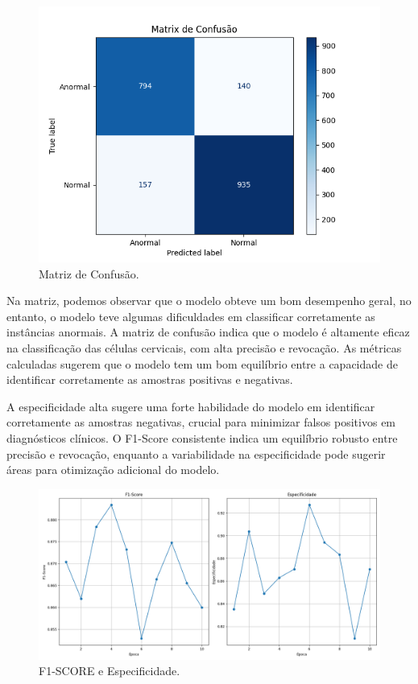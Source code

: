 \begin{figure}[H]
    \centering
    \includegraphics[width=1.0\textwidth]{figuras/matriz.png}
    \caption{Matriz de Confusão.}
    \label{fig:nome_da_imagem}
\end{figure}


Na matriz, podemos observar que o modelo obteve um bom desempenho geral, no entanto, o modelo teve algumas dificuldades em classificar corretamente as instâncias anormais. A matriz de confusão indica que o modelo é altamente eficaz na classificação das células cervicais, com alta precisão e revocação. As métricas calculadas sugerem que o modelo tem um bom equilíbrio entre a capacidade de identificar corretamente as amostras positivas e negativas.

A especificidade alta sugere uma forte habilidade do modelo em identificar corretamente as amostras negativas, crucial para minimizar falsos positivos em diagnósticos clínicos. O F1-Score consistente indica um equilíbrio robusto entre precisão e revocação, enquanto a variabilidade na especificidade pode sugerir áreas para otimização adicional do modelo.

\begin{figure}[H]
    \centering
    \includegraphics[width=1.0\textwidth]{figuras/F1_Esp.png}
    \caption{F1-SCORE e Especificidade.}
    \label{fig:nome_da_imagem}
\end{figure}
